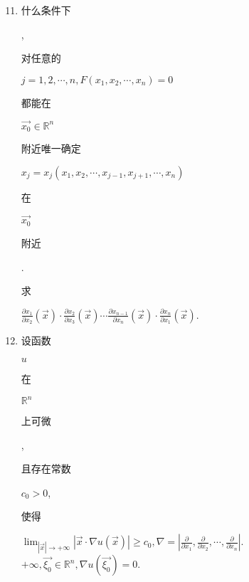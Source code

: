 \documentclass[10pt]{article}
\begin{document}
\begin{enumerate}
  \setcounter{enumi}{10}
  \item \begin{CJK}{UTF8}{mj}什么条件下\end{CJK}, \begin{CJK}{UTF8}{mj}对任意的\end{CJK} $j=1,2, \cdots, n, F\left(x_{1}, x_{2}, \cdots, x_{n}\right)=0$ \begin{CJK}{UTF8}{mj}都能在\end{CJK} $\overrightarrow{x_{0}} \in \mathbb{R}^{n}$ \begin{CJK}{UTF8}{mj}附近唯一确定\end{CJK} $x_{j}=x_{j}\left(x_{1}, x_{2}, \cdots, x_{j-1}, x_{j+1}, \cdots, x_{n}\right)$ \begin{CJK}{UTF8}{mj}在\end{CJK} $\overrightarrow{x_{0}}$ \begin{CJK}{UTF8}{mj}附近\end{CJK}. \begin{CJK}{UTF8}{mj}求\end{CJK} $\frac{\partial x_{1}}{\partial x_{2}}(\vec{x}) \cdot \frac{\partial x_{2}}{\partial x_{3}}(\vec{x}) \cdots \frac{\partial x_{n-1}}{\partial x_{n}}(\vec{x}) \cdot \frac{\partial x_{n}}{\partial x_{1}}(\vec{x})$.

  \item \begin{CJK}{UTF8}{mj}设函数\end{CJK} $u$ \begin{CJK}{UTF8}{mj}在\end{CJK} $\mathbb{R}^{n}$ \begin{CJK}{UTF8}{mj}上可微\end{CJK}, \begin{CJK}{UTF8}{mj}且存在常数\end{CJK} $c_{0}>0$, \begin{CJK}{UTF8}{mj}使得\end{CJK} $\lim _{|\vec{x}| \rightarrow+\infty}|\vec{x} \cdot \nabla u(\vec{x})| \geq c_{0}, \nabla=\left|\frac{\partial}{\partial x_{1}}, \frac{\partial}{\partial x_{2}}, \cdots, \frac{\partial}{\partial x_{n}}\right|$. $+\infty, \overrightarrow{\xi_{0}} \in \mathbb{R}^{n}, \nabla u\left(\overrightarrow{\xi_{0}}\right)=0 .$


\end{enumerate}
\end{document}
